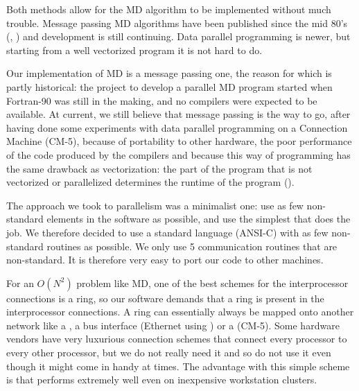 Both methods allow for the MD algorithm to be implemented without much
trouble. Message passing MD algorithms have been published
since the mid 80's (\cite{Fincham87}, \cite{Raine89}) 
and development is still continuing. 
Data parallel programming is newer,
but starting from a well vectorized program it is not hard to do.

Our implementation of MD is a message passing one, the reason for which
is partly historical: the project to develop a parallel MD program started
when Fortran-90 was still in the making, and no compilers were
expected to be available. 
At current, we still believe that message passing is the way
to go, after having done some experiments with data parallel programming on a
Connection Machine (CM-5), because of portability to other hardware,
the poor performance of the code produced by the compilers 
and because this way of programming
has the same drawback as vectorization: the part of the program that is
not vectorized or parallelized determines the runtime of the program
().

The approach we took to parallelism was a minimalist one: use as few
non-standard elements in the software as possible, and use the
simplest  that does the job. We therefore 
decided to use a standard language (ANSI-C) with as few non-standard
routines as possible. We only use 5 communication routines that are
non-standard. It is therefore very easy to port our code to other machines.

For an $O(N^2)$ problem like MD, one of the best schemes for the
interprocessor connections is a ring, so our software demands that a
ring is present in the interprocessor connections. A ring can essentially
always be mapped onto another network like a , a
bus interface (Ethernet {\eg} using 
 ) or 
a 
(CM-5). Some hardware vendors have very luxurious connection schemes
that connect every processor to every other processor, but we do not
really need it and so do not use it even though it might come in handy
at times. The advantage with this simple scheme is that {\gromacs}
performs extremely well even on inexpensive workstation clusters.

